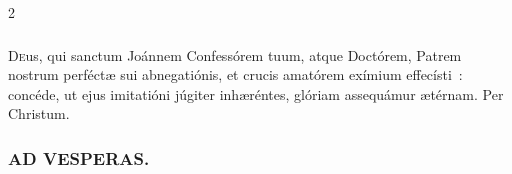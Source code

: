 \documentclass[9pt,twoside]{extarticle}
\begin{document}
\begin{multicols}{2}
\subsubsection*{\center{}}
\lettrine{D}eus, qui sanctum Joánnem Confessórem tuum, atque Doctórem, Patrem nostrum perféctæ sui abnegatiónis, et crucis amatórem exímium effecísti~: concéde, ut ejus imitatióni júgiter inhæréntes, glóriam assequámur ætérnam. Per Christum.

\subsubsection*{\center \textsc{AD VESPERAS.}}
\begin{tightlist}{}
\item {}
\end{tightlist}

\end{multicols}
\end{document}
